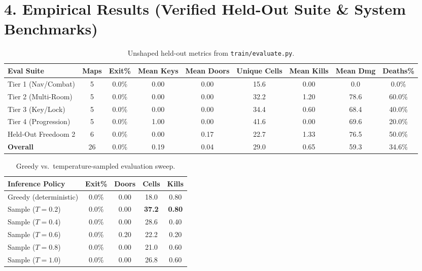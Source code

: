 \documentclass[10pt,twocolumn]{article}
\begin{document}
\section*{4. Empirical Results \textnormal{\small(Verified Held-Out Suite \& System Benchmarks)}}

\begin{table}[t]
\centering
\small
\begin{tabular}{lcccccccc}
\toprule
\textbf{Eval Suite} & \textbf{Maps} & \textbf{Exit\%} & \textbf{Mean Keys} & \textbf{Mean Doors} & \textbf{Unique Cells} & \textbf{Mean Kills} & \textbf{Mean Dmg} & \textbf{Deaths\%} \\
\midrule
Tier 1 (Nav/Combat)  & 5    &   0.0\% &  0.00 &  0.00 &  15.6 &  0.00 &   0.0 &   0.0\% \\
Tier 2 (Multi-Room)  & 5    &   0.0\% &  0.00 &  0.00 &  32.2 &  1.20 &  78.6 &  60.0\% \\
Tier 3 (Key/Lock)    & 5    &   0.0\% &  0.00 &  0.00 &  34.4 &  0.60 &  68.4 &  40.0\% \\
Tier 4 (Progression) & 5    &   0.0\% &  1.00 &  0.00 &  41.6 &  0.00 &  69.6 &  20.0\% \\
Held-Out Freedoom 2  & 6    &   0.0\% &  0.00 &  0.17 &  22.7 &  1.33 &  76.5 &  50.0\% \\
\midrule
\textbf{Overall}        & 26   &   0.0\% &  0.19 &  0.04 &  29.0 &  0.65 &  59.3 &  34.6\% \\
\bottomrule
\end{tabular}
\caption{Unshaped held-out metrics from \texttt{train/evaluate.py}.}
\end{table}

\begin{table}[h!]
\centering
\scriptsize
\setlength{\tabcolsep}{4pt}
\begin{tabular}{lcccc}
\toprule
\textbf{Inference Policy} & \textbf{Exit\%} & \textbf{Doors} & \textbf{Cells} & \textbf{Kills} \\
\midrule
Greedy (deterministic) & 0.0\% & 0.00 & 18.0 & 0.80 \\
Sample ($T=0.2$)       & 0.0\% & 0.00 & \textbf{37.2} & \textbf{0.80} \\
Sample ($T=0.4$)       & 0.0\% & 0.00 & 28.6 & 0.40 \\
Sample ($T=0.6$)       & 0.0\% & 0.20 & 22.2 & 0.20 \\
Sample ($T=0.8$)       & 0.0\% & 0.00 & 21.0 & 0.60 \\
Sample ($T=1.0$)       & 0.0\% & 0.00 & 26.8 & 0.60 \\
\bottomrule
\end{tabular}
\caption{Greedy vs.\ temperature-sampled evaluation sweep.}
\end{table}
\end{document}
